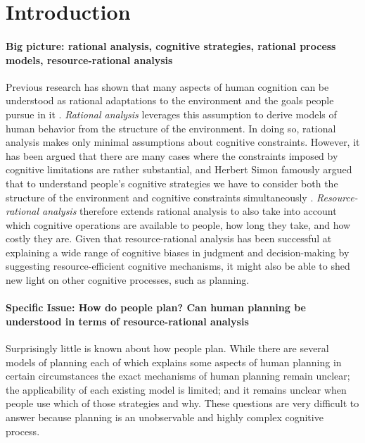 
\section{Introduction}
\label{sec:introduction}

\paragraph{Big picture: rational analysis, cognitive strategies, rational process models, resource-rational analysis}
Previous research has shown that many aspects of human cognition can be understood as rational adaptations to the environment and the goals people pursue in it \citep{Anderson1990,Chater1999}. \textit{Rational analysis} leverages this assumption to derive models of human behavior from the structure of the environment. In doing so, rational analysis makes only minimal assumptions about cognitive constraints. %
However, it has been argued that there are many cases where the constraints imposed by cognitive limitations are rather substantial, and Herbert Simon famously argued that to understand people's cognitive strategies we have to  consider both the structure of the environment and cognitive constraints simultaneously \citep{Simon1956,Simon1982}. \textit{Resource-rational analysis} \citep{GriffithsLiederGoodman2015} therefore extends rational analysis to also take into account which cognitive operations are available to people, how long they take, and how costly they are. Given that resource-rational analysis has been successful at explaining a wide range of cognitive biases in judgment \citep{LiederGriffithsHuysGoodman2017a,LiederGriffithsHuysGoodman2017b} and decision-making \citep{LiederGriffithsHsu2017} by suggesting resource-efficient cognitive mechanisms, it might also be able to shed new light on other cognitive processes, such as planning.

\paragraph{Specific Issue: How do people plan? Can human planning be understood in terms of resource-rational analysis}
Surprisingly little is known about how people plan. While there are several models of planning \citep{Newell1956,NewellSimon1972a,deGroot1965,Korf1987,Huys2012,Huys2015,Keramati2016} each of which explains some aspects of human planning in certain circumstances the exact mechanisms of human planning remain unclear; the applicability of each existing model is limited; and it remains unclear when people use which of those strategies and why. These questions are very difficult to answer because planning is an unobservable and highly complex cognitive process.

